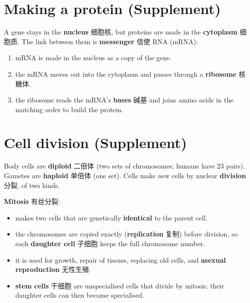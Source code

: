 \documentclass[11pt]{article}
\begin{document}
\section*{Making a protein (Supplement)}

A gene stays in the \textbf{nucleus} 细胞核, but proteins are made in the \textbf{cytoplasm} 细胞质. The link between them is \textbf{messenger} 信使 RNA (mRNA):

\begin{enumerate}
\item mRNA is made in the nucleus as a copy of the gene.

\item the mRNA moves out into the cytoplasm and passes through a \textbf{ribosome} 核糖体.

\item the ribosome reads the mRNA's \textbf{bases} 碱基 and joins amino acids in the matching order to build the protein.

\end{enumerate}

\section*{Cell division (Supplement)}

Body cells are \textbf{diploid} 二倍体 (two sets of chromosomes; humans have 23 pairs). Gametes are \textbf{haploid} 单倍体 (one set). Cells make new cells by nuclear \textbf{division} 分裂, of two kinds.

\textbf{Mitosis} 有丝分裂:

\begin{itemize}
\item makes two cells that are genetically \textbf{identical} to the parent cell.

\item the chromosomes are copied exactly (\textbf{replication} 复制) before division, so each \textbf{daughter cell} 子细胞 keeps the full chromosome number.

\item it is used for growth, repair of tissues, replacing old cells, and \textbf{asexual reproduction} 无性生殖.

\item \textbf{stem cells} 干细胞 are unspecialised cells that divide by mitosis; their daughter cells can then become specialised.

\end{itemize}
\end{document}
